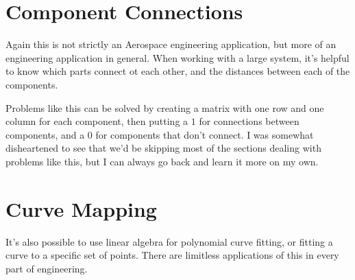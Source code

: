 \documentclass[10pt,letterpaper]{article}
\begin{document}
	\section*{Component Connections}
	
	Again this is not strictly an Aerospace engineering application, but more of an engineering application in general. When working with a large system, it's helpful to know which parts connect ot each other, and the distances between each of the components. 
	
	Problems like this can be solved by creating a matrix with one row and one column for each component, then putting a $1$ for connections between components, and a $0$ for components that don't connect.  I was somewhat disheartened to see that we'd be skipping most of the sections dealing with problems like this, but I can always go back and learn it more on my own. 
	
	\section*{Curve Mapping}
	It's also possible to use linear algebra for polynomial curve fitting, or fitting a curve to a specific set of points.  There are limitless applications of this in every part of engineering. 
\end{document}
